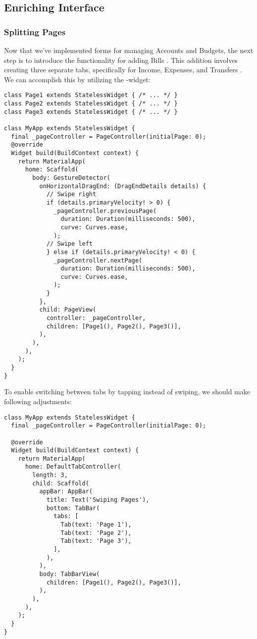 
\subsection{Enriching Interface}

\subsubsection{Splitting Pages}

Now that we've implemented forms for managing Accounts and Budgets, the next step is to introduce the functionality 
for adding Bills . This addition involves creating three separate tabs, specifically for Income, Expenses, 
and Transfers . We can accomplish this by utilizing the -widget:

\begin{lstlisting}
class Page1 extends StatelessWidget { /* ... */ }
class Page2 extends StatelessWidget { /* ... */ }
class Page3 extends StatelessWidget { /* ... */ }

class MyApp extends StatelessWidget {
  final _pageController = PageController(initialPage: 0);
  @override
  Widget build(BuildContext context) {
    return MaterialApp(
      home: Scaffold(
        body: GestureDetector(
          onHorizontalDragEnd: (DragEndDetails details) {
            // Swipe right
            if (details.primaryVelocity! > 0) { 
              _pageController.previousPage(
                duration: Duration(milliseconds: 500),
                curve: Curves.ease,
              );
            // Swipe left
            } else if (details.primaryVelocity! < 0) { 
              _pageController.nextPage(
                duration: Duration(milliseconds: 500),
                curve: Curves.ease,
              );
            }
          },
          child: PageView(
            controller: _pageController,
            children: [Page1(), Page2(), Page3()],
          ),
        ),
      ),
    );
  }
}
\end{lstlisting}

\noindent To enable switching between tabs by tapping instead of swiping, we should make following adjustments:

\begin{lstlisting}
class MyApp extends StatelessWidget {
  final _pageController = PageController(initialPage: 0);

  @override
  Widget build(BuildContext context) {
    return MaterialApp(
      home: DefaultTabController(
        length: 3,
        child: Scaffold(
          appBar: AppBar(
            title: Text('Swiping Pages'),
            bottom: TabBar(
              tabs: [
                Tab(text: 'Page 1'),
                Tab(text: 'Page 2'),
                Tab(text: 'Page 3'),
              ],
            ),
          ),
          body: TabBarView(
            children: [Page1(), Page2(), Page3()],
          ),
        ),
      ),
    );
  }
}
\end{lstlisting}

